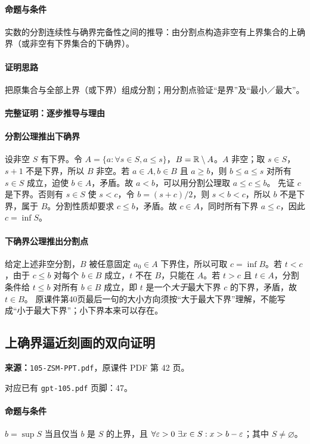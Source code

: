 \paragraph{命题与条件}实数的分割连续性与确界完备性之间的推导：由分割点构造非空有上界集合的上确界（或非空有下界集合的下确界）。
\paragraph{证明思路}把原集合与全部上界（或下界）组成分割；用分割点验证“是界”及“最小／最大”。
\paragraph{完整证明：逐步推导与理由}

\paragraph{分割公理推出下确界}
设非空 $S$ 有下界。令 $A=\{a:\forall s\in S,a\le s\}$，$B=\mathbb{R}\setminus A$。$A$ 非空；取 $s\in S$，$s+1$ 不是下界，所以 $B$ 非空。若 $a\in A,b\in B$ 且 $a\ge b$，则 $b\le a\le s$ 对所有 $s\in S$ 成立，迫使 $b\in A$，矛盾。故 $a<b$，可以用分割公理取 $a\le c\le b$。
先证 $c$ 是下界。否则有 $s\in S$ 使 $s<c$，令 $b=(s+c)/2$，则 $s<b<c$，所以 $b$ 不是下界，属于 $B$。分割性质却要求 $c\le b$，矛盾。故 $c\in A$，同时所有下界 $a\le c$，因此 $c=\inf S$。
\paragraph{下确界公理推出分割点}
给定上述非空分割，$B$ 被任意固定 $a_0\in A$ 下界住，所以可取 $c=\inf B$。若 $t<c$，由于 $c\le b$ 对每个 $b\in B$ 成立，$t$ 不在 $B$，只能在 $A$。若 $t>c$ 且 $t\in A$，分割条件给 $t\le b$ 对所有 $b\in B$ 成立，即 $t$ 是一个\emph{大于}最大下界 $c$ 的下界，矛盾，故 $t\in B$。
原课件第40页最后一句的大小方向须按“大于最大下界”理解，不能写成“小于最大下界”；小下界本来可以存在。

\clearpage\subsection{上确界逼近刻画的双向证明}
\textbf{来源：}\texttt{105-ZSM-PPT.pdf}，原课件 PDF 第 42 页。\par
对应已有 \texttt{gpt-105.pdf} 页脚：47。\par
\paragraph{命题与条件}$b=\sup S$ 当且仅当 $b$ 是 $S$ 的上界，且 $\forall\varepsilon>0\ \exists x\in S:x>b-\varepsilon$；其中 $S\ne\varnothing$。
